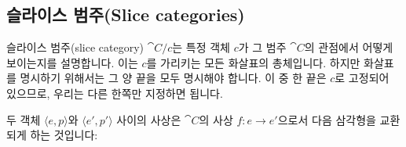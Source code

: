 \documentclass[DaoFP]{subfiles}
\begin{document}
\subsection{슬라이스 범주(Slice categories)}



슬라이스 범주(slice category) $\cat C/c$는 특정 객체 $c$가 그 범주 $\cat C$의 관점에서 어떻게 보이는지를 설명합니다. 이는 $c$를 가리키는 모든 화살표의 총체입니다. 하지만 화살표를 명시하기 위해서는 그 양 끝을 모두 명시해야 합니다. 이 중 한 끝은 $c$로 고정되어 있으므로, 우리는 다른 한쪽만 지정하면 됩니다.



두 객체 $\langle e, p \rangle$와 $\langle e', p' \rangle$ 사이의 사상은 $\cat C$의 사상 $f \colon e \to e'$으로서 다음 삼각형을 교환되게 하는 것입니다:
\end{document}
